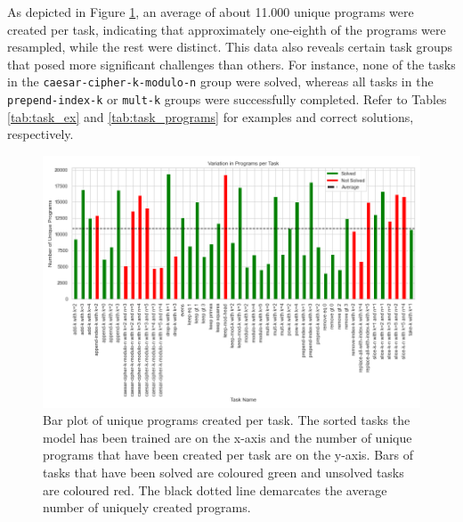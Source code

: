 As depicted in Figure \ref{fig:program_variations_binary_train}, an average of about 11.000 unique programs were created per task, indicating that approximately one-eighth of the programs were resampled, while the rest were distinct. This data also reveals certain task groups that posed more significant challenges than others. For instance, none of the tasks in the \texttt{caesar-cipher-k-modulo-n} group were solved, whereas all tasks in the \texttt{prepend-index-k} or \texttt{mult-k} groups were successfully completed. Refer to Tables \ref{tab:task_ex} and \ref{tab:task_programs} for examples and correct solutions, respectively.

\begin{figure}
    \centering
    \includegraphics[width=\textwidth]{../img/plot_program_variations_binary_depth_3_48_tasks2023-12-07 22:24:45.png}
    \caption{Bar plot of unique programs created per task. The sorted tasks the model has been trained are on the x-axis and the number of unique programs that have been created per task are on the y-axis. Bars of tasks that have been solved are coloured green and unsolved tasks are coloured red. The black dotted line demarcates the average number of uniquely created programs.}
    \label{fig:program_variations_binary_train}
\end{figure}

